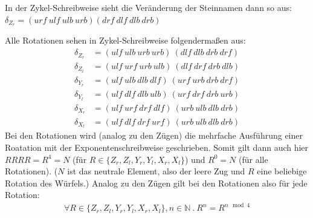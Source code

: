 \documentclass[12pt,a4paper, usenames, dvipsnames]{article}
\theoremstyle{mystyle}
\theoremstyle{definition}
\newcommand{\Gtwo}{\ensuremath{G_{2\times 2\times 2}}}
\begin{document}
In der Zykel-Schreibweise sieht die Veränderung der Steinnamen dann so aus: \\
$\delta_{Z_r}=(urf \ ulf \ ulb \ urb)(drf \ dlf \ dlb \ drb )$ 

Alle Rotationen sehen in Zykel-Schreibweise folgendermaßen aus:
\begin{align*}
\delta_{Z_r} & = (ulf \ ulb \ urb \ urb) \ (dlf \ dlb \ drb \ drf)\\
\delta_{Z_l} & = (ulf \ urf \ urb \ ulb) \ (dlf \ drf \ drb \ dlb)\\
\delta_{Y_r} & = (ulf \ ulb \ dlb \ dlf) \ (urf \ urb \ drb \ drf)\\
\delta_{Y_l} & = (ulf \ dlf \ dlb \ ulb) \ (urf \ drf \ drb \ urb)\\
\delta_{X_r} & = (ulf \ urf \ drf \ dlf) \ (urb \ ulb \ dlb \ drb)\\
\delta_{X_l} & = (ulf \ dlf \ drf \ urf) \ (urb \ ulb \ dlb \ drb)
\end{align*}
Bei den Rotationen wird (analog zu den Zügen) die mehrfache Ausführung einer Roatation mit der Exponentenschreibweise geschrieben. 
Somit gilt dann auch hier $RRRR=R^4=N$ (für $R \in \{{Z_r}, {Z_l}, {Y_r}, {Y_l}, {X_r}, {X_l} \}$) und $R^0=N$ (für alle Rotationen). ($N$ ist das neutrale Element, also der leere Zug und $R$ eine beliebige Rotation des Würfels.) 
Analog zu den Zügen gilt bei den Rotationen also für jede Rotation: 
\begin{align*}
\forall R \in \{{Z_r}, {Z_l}, {Y_r}, {Y_l}, {X_r}, {X_l} \}, n \in \mathbb{N} \ . \ R^n=R^{n \mod 4}
\end{align*}

%
%
%
%
%
%
%
%
%
%
%
%
%
%
%
%
%
%
%
%





\end{document}
